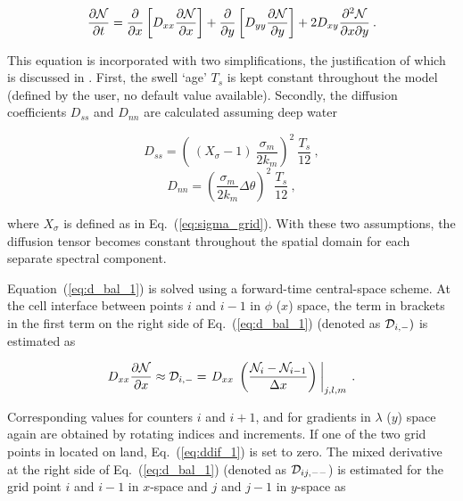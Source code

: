 
\begin{equation}
\frac{\partial {\cal N}}{\partial t} = 
\frac{\partial}{\partial x} \left [ D_{xx} \frac{\partial {\cal N}}{\partial x} \right ] +
\frac{\partial}{\partial y} \left [ D_{yy} \frac{\partial {\cal N}}{\partial y} \right ] +
   2 D_{xy} \frac{\partial^2 {\cal N}}{\partial x \partial y}
\: . \label{eq:d_bal_1} \end{equation}

\noindent
This equation is incorporated with two simplifications, the justification of
which is discussed in \cite{tol:OMB95}. First, the swell `age' $T_s$ is kept
constant throughout the model (defined by the user, no default value
available). Secondly, the diffusion coefficients $D_{ss}$ and $D_{nn}$ are
calculated assuming deep water


\begin{equation}
D_{ss} = \left ( \: (X_\sigma-1) \: \frac{\sigma_m}{2 k_m} \right )^2
\: \frac{T_s}{12} \: , \label{eq:Dss_d} \end{equation} \begin{equation}
D_{nn} =  \left ( \frac{\sigma_m}{2 k_m} \Delta \theta \right )^2
\: \frac{T_s}{12} \: , \label{eq:Dnn_d} \end{equation}

\noindent
where $X_\sigma$ is defined as in Eq.~(\ref{eq:sigma_grid}). With these two
assumptions, the diffusion tensor becomes constant throughout the spatial
domain for each separate spectral component.

Equation~(\ref{eq:d_bal_1}) is solved using a forward-time central-space
scheme. At the cell interface between points $i$ and $i-1$ in $\phi$ ($x$)
space, the term in brackets in the first term on the right side of
Eq.~(\ref{eq:d_bal_1}) (denoted as ${\cal D}_{i,-})$ is estimated as


\begin{equation}
D_{xx} \frac{\partial {\cal N}}{\partial x} \approx {\cal D}_{i,-} =
\left . D_{xx} \; \left ( \frac{{\cal N}_i - {\cal N}_{i-1}}{\Delta x} \right ) \: 
\right |_{j,l,m} \: . \label{eq:ddif_1} \end{equation}

\noindent
Corresponding values for counters $i$ and $i+1$, and for gradients in
$\lambda$ ($y$) space again are obtained by rotating indices and
increments. If one of the two grid points in located on land,
Eq.~(\ref{eq:ddif_1}) is set to zero. The mixed derivative at the right side
of Eq.~(\ref{eq:d_bal_1}) (denoted as ${\cal D}_{ij,--}$) is estimated for the grid
point $i$ and $i-1$ in $x$-space and $j$ and $j-1$ in $y$-space as

